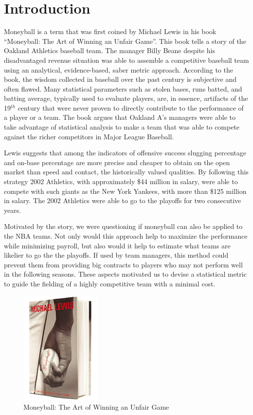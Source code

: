 \documentclass{acm_proc_article-sp}
\begin{document}

\section{Introduction}
\vspace{0.5em}
Moneyball is a term that was first coined by Michael Lewis in his book ``Moneyball: The Art of Winning an Unfair Game''. This book tells a story of the Oakland Athletics baseball team. The manager Billy Beane despite his disadvantaged revenue situation was able to assemble a competitive baseball team using an analytical, evidence-based, saber metric approach. According to the book, the wisdom collected in baseball over the past century is subjective and often flawed. Many statistical parameters such as stolen bases, runs batted, and batting average, typically used to evaluate players, are, in essence, artifacts of the 19$^{th}$ century that were never proven to directly contribute to the performance of a player or a team. The book argues that Oakland A's managers were able to take advantage of statistical analysis to make a team that was able to compete against the richer competitors in Major League Baseball.

Lewis suggests that among the indicators of offensive success slugging percentage and on-base percentage are more precise and cheaper to obtain on the open market than speed and contact, the historically valued qualities. By following this strategy 2002 Athletics, with approximately \$44 million in salary, were able to compete with such giants as the New York Yankees, with more than \$125 million in salary. The 2002 Athletics were able to go to the playoffs for two consecutive years.  ~\cite{A}

Motivated by the story, we were questioning if moneyball can also be applied to the NBA teams. Not only would this approach help to maximize the performance  while minimizing payroll, but also would it help to estimate what teams are likelier to go the the playoffs. If used by team managers, this method could prevent them from providing big contracts to players who may not perform well in the following seasons.  These aspects motivated us to devise a statistical metric to guide the fielding of a highly competitive team with a minimal cost.
\begin{figure}[!htb]
\centering
\includegraphics{Fig-1.png}
\caption{Moneyball: The Art of Winning an Unfair Game}
\end{figure}
\end{document}
